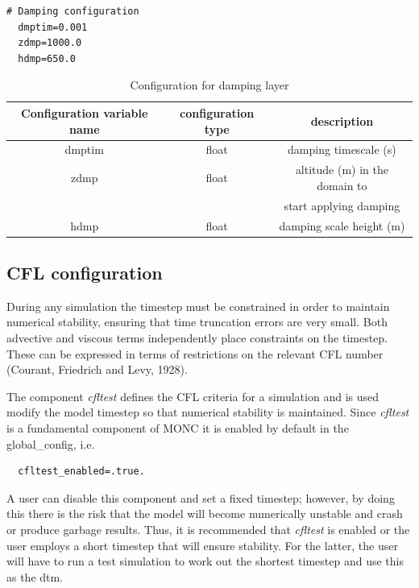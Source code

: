\documentclass[a4paper,11pt]{article}
\begin{document}
\begin{lstlisting}[caption={Example configuration snippet for damping.
   Taken from testcases/stratus/fire\_sc.mcf}]
  # Damping configuration
  dmptim=0.001
  zdmp=1000.0
  hdmp=650.0
\end{lstlisting}

\begin{table}[H]
\protect\caption{Configuration for damping layer}
\label{tab:damping}
\begin{tabular}{|c|c|c|}
\hline
Configuration variable name & configuration type & description\tabularnewline
\hline
\hline
 dmptim & float & damping timescale (s) \tabularnewline
\hline
 zdmp  & float &  altitude (m) in the domain to   \tabularnewline
 &  & start applying damping \tabularnewline
\hline
 hdmp & float & damping scale height (m) \tabularnewline
\hline
\hline
\end{tabular}
\end{table}

\subsection{CFL configuration}

During any simulation the timestep must be constrained in order to maintain
numerical stability, ensuring that time truncation errors are very small. Both
advective and viscous terms independently place constraints on the timestep.
These can be expressed in terms of restrictions on the relevant CFL number
(Courant, Friedrich and Levy, 1928).

The component \emph{cfltest} defines the CFL criteria for a simulation and
is used modify the model timestep so that numerical stability is maintained.
Since \emph{cfltest} is a fundamental component of MONC it is enabled by default in the
global\_config, i.e.
\begin{lstlisting}
  cfltest_enabled=.true.
\end{lstlisting}

A user can disable this component and set a fixed timestep; however, by doing this
there is the risk that the model will become numerically unstable and crash or
produce garbage results. Thus, it is recommended that \emph{cfltest} is enabled
or the user employs a short timestep that will ensure stability. For the latter,
the user will have to run a test simulation to work out the shortest timestep and
use this as the dtm.
\end{document}

